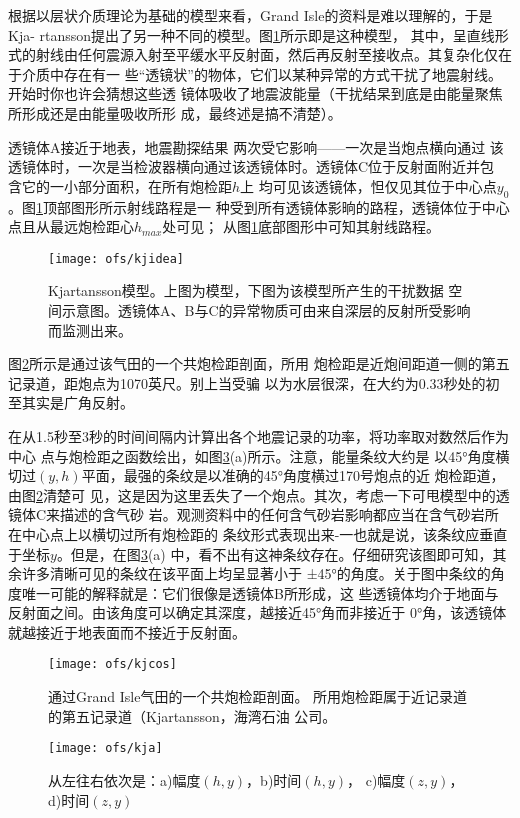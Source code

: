 根据以层状介质理论为基础的模型来看，Grand
Isle的资料是难以理解的，于是Kja-
rtansson提出了另一种不同的模型。图\ref{fig:ofs/kjidea}所示即是这种模型，
其中，呈直线形式的射线由任何震源入射至平缓水平反射面，然后再反射至接收点。其复杂化仅在于介质中存在有一
些“透镜状”的物体，它们以某种异常的方式干扰了地震射线。开始时你也许会猜想这些透
镜体吸收了地震波能量（干扰结杲到底是由能量聚焦所形成还是由能量吸收所形
成，最终述是搞不清楚）。

透镜体A接近于地表，地震勘探结果 两次受它影响——一次是当炮点横向通过
该透镜体时，一次是当检波器横向通过该透镜体时。透镜体C位于反射面附近并包
含它的一小部分面积，在所有炮检距$h$上
均可见该透镜体，怛仅见其位于中心点$y_0$。图\ref{fig:ofs/kjidea}顶部图形所示射线路程是一
种受到所有透镜体影晌的路程，透镜体位于中心点且从最远炮检距心$h_{max}$处可见；
从图\ref{fig:ofs/kjidea}底部图形中可知其射线路程。
\begin{figure}[H]
\centering
\texttt{[image: ofs/kjidea]}
\caption[kjidea]{Kjartansson模型。上图为模型，下图为该模型所产生的干扰数据
空间示意图。透镜体A、B与C的异常物质可由来自深层的反射所受影响而监测出来。
}
\label{fig:ofs/kjidea}
\end{figure}
图\ref{fig:ofs/kjcos}所示是通过该气田的一个共炮检距剖面，所用
炮检距是近炮间距道一侧的第五记录道，距炮点为1070英尺。别上当受骗
以为水层很深，在大约为0.33秒处的初至其实是广角反射。

在从1.5秒至3秒的时间间隔内计算出各个地震记录的功率，将功率取对数然后作为中心
点与炮检距之函数绘出，如图\ref{fig:ofs/kja}(a)所示。注意，能量条纹大约是
以45°角度横切过$(y,h)$平面，最强的条纹是以准确的45°角度横过170号炮点的近
炮检距道，由图\ref{fig:ofs/kjcos}清楚可
见，这是因为这里丢失了一个炮点。其次，考虑一下可甩模型中的透镜体C来描述的含气砂
岩。观测资料中的任何含气砂岩影响都应当在含气砂岩所在中心点上以横切过所有炮检距的
条纹形式表现出来-一也就是说，该条纹应垂直于坐标$y$。但是，在图\ref{fig:ofs/kja}(a)
中，看不出有这神条纹存在。仔细研究该图即可知，其余许多清晰可见的条纹在该平面上均呈显著小于
±45°的角度。关于图中条纹的角度唯一可能的解释就是：它们很像是透镜体B所形成，这
些透镜体均介于地面与反射面之间。由该角度可以确定其深度，越接近45°角而非接近于
0°角，该透镜体就越接近于地表面而不接近于反射面。

\begin{figure}[H]
\centering
\texttt{[image: ofs/kjcos]}
\caption[kjcos]{通过Grand Isle气田的一个共炮检距剖面。
所用炮检距属于近记录道的第五记录道（Kjartansson，海湾石油
公司。}
\label{fig:ofs/kjcos}
\end{figure}

\begin{figure}[H]
\centering
\texttt{[image: ofs/kja]}
\caption[kja]{从左往右依次是：a)幅度$(h,y)$，b)时间$(h,y)$，
c)幅度$(z,y)$，d)时间$(z,y)$}
\label{fig:ofs/kja}
\end{figure}
